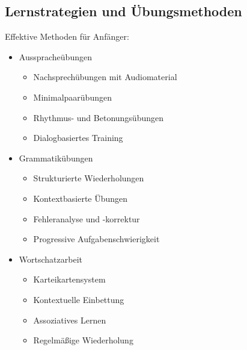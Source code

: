 \subsection{Lernstrategien und Übungsmethoden}
Effektive Methoden für Anfänger:
\begin{itemize}
    \item Ausspracheübungen
    \begin{itemize}
        \item Nachsprechübungen mit Audiomaterial
        \item Minimalpaarübungen
        \item Rhythmus- und Betonungsübungen
        \item Dialogbasiertes Training
    \end{itemize}
    
    \item Grammatikübungen
    \begin{itemize}
        \item Strukturierte Wiederholungen
        \item Kontextbasierte Übungen
        \item Fehleranalyse und -korrektur
        \item Progressive Aufgabenschwierigkeit
    \end{itemize}
    
    \item Wortschatzarbeit
    \begin{itemize}
        \item Karteikartensystem
        \item Kontextuelle Einbettung
        \item Assoziatives Lernen
        \item Regelmäßige Wiederholung
    \end{itemize}
\end{itemize}

